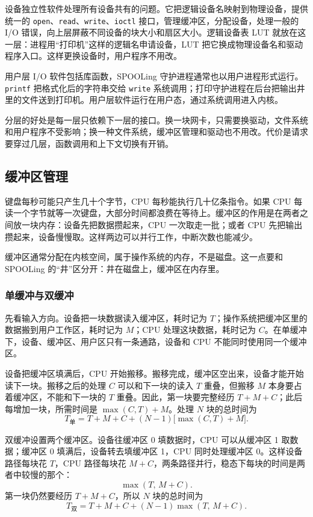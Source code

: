 设备独立性软件处理所有设备共有的问题。它把逻辑设备名映射到物理设备，提供统一的 \texttt{open}、\texttt{read}、\texttt{write}、\texttt{ioctl} 接口，管理缓冲区，分配设备，处理一般的 I/O 错误，向上层屏蔽不同设备的块大小和扇区大小。逻辑设备表 LUT 就放在这一层：进程用“打印机”这样的逻辑名申请设备，LUT 把它换成物理设备名和驱动程序入口。这样更换设备时，用户程序不用改。

用户层 I/O 软件包括库函数，SPOOLing 守护进程通常也以用户进程形式运行。\texttt{printf} 把格式化后的字符串交给 \texttt{write} 系统调用；打印守护进程在后台把输出井里的文件送到打印机。用户层软件运行在用户态，通过系统调用进入内核。

分层的好处是每一层只依赖下一层的接口。换一块网卡，只需要换驱动，文件系统和用户程序不受影响；换一种文件系统，缓冲区管理和驱动也不用改。代价是请求要穿过几层，函数调用和上下文切换有开销。

\subsection{缓冲区管理}

键盘每秒可能只产生几十个字节，CPU 每秒能执行几十亿条指令。如果 CPU 每读一个字节就等一次键盘，大部分时间都浪费在等待上。缓冲区的作用是在两者之间放一块内存：设备先把数据攒起来，CPU 一次取走一批；或者 CPU 先把输出攒起来，设备慢慢取。这样两边可以并行工作，中断次数也能减少。

缓冲区通常分配在内核空间，属于操作系统的内存，不是磁盘。这一点要和 SPOOLing 的“井”区分开：井在磁盘上，缓冲区在内存里。

\subsubsection{单缓冲与双缓冲}

先看输入方向。设备把一块数据读入缓冲区，耗时记为 $T$；操作系统把缓冲区里的数据搬到用户工作区，耗时记为 $M$；CPU 处理这块数据，耗时记为 $C$。在单缓冲下，设备、缓冲区、用户区只有一条通路，设备和 CPU 不能同时使用同一个缓冲区。

设备把缓冲区填满后，CPU 开始搬移。搬移完成，缓冲区空出来，设备才能开始读下一块。搬移之后的处理 $C$ 可以和下一块的读入 $T$ 重叠，但搬移 $M$ 本身要占着缓冲区，不能和下一块的 $T$ 重叠。因此，第一块要完整经历 $T+M+C$；此后每增加一块，所需时间是 $\max(C,T)+M$。处理 $N$ 块的总时间为
\[
T_{\text{单}}=T+M+C+(N-1)\bigl[\max(C,T)+M\bigr].
\]

双缓冲设置两个缓冲区。设备往缓冲区 0 填数据时，CPU 可以从缓冲区 1 取数据；缓冲区 0 填满后，设备转去填缓冲区 1，CPU 同时处理缓冲区 0。这样设备路径每块花 $T$，CPU 路径每块花 $M+C$，两条路径并行，稳态下每块的时间是两者中较慢的那个：
\[
\max(T,\,M+C).
\]
第一块仍然要经历 $T+M+C$，所以 $N$ 块的总时间为
\[
T_{\text{双}}=T+M+C+(N-1)\max(T,\,M+C).
\]

